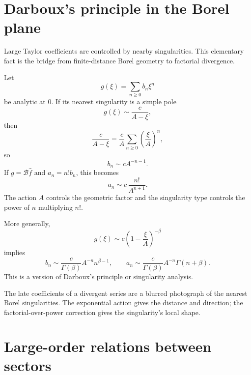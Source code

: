 \documentclass[11pt,openany]{book}
\theoremstyle{definition}
\theoremstyle{plain}
\theoremstyle{remark}
\newcommand{\trans}[1]{\widehat{#1}}
\newcommand{\Borel}{\mathcal{B}}
\begin{document}
\section{Darboux's principle in the Borel plane}

Large Taylor coefficients are controlled by nearby singularities. This elementary fact is the bridge from finite-distance Borel geometry to factorial divergence.

Let
\[
 g(\xi)=\sum_{n\ge0}b_n\xi^n
\]
be analytic at $0$. If its nearest singularity is a simple pole
\begin{equation}\label{eq:local-simple-pole}
 g(\xi)\sim\frac{c}{A-\xi},
\end{equation}
then
\[
 \frac{c}{A-\xi}
 =\frac{c}{A}\sum_{n\ge0}\left(\frac\xi A\right)^n,
\]
so
\begin{equation}\label{eq:darboux-pole}
 b_n\sim cA^{-n-1}.
\end{equation}
If $g=\Borel\trans f$ and $a_n=n!b_n$, this becomes
\begin{equation}\label{eq:factorial-from-pole}
 a_n\sim c\,\frac{n!}{A^{n+1}}.
\end{equation}
The action $A$ controls the geometric factor and the singularity type controls the power of $n$ multiplying $n!$.

More generally,
\begin{equation}\label{eq:branch-darboux}
 g(\xi)\sim c\left(1-\frac\xi A\right)^{-\beta}
\end{equation}
implies
\begin{equation}\label{eq:branch-coefficients}
 b_n\sim
 \frac{c}{\Gamma(\beta)}A^{-n}n^{\beta-1},
 \qquad
 a_n\sim
 \frac{c}{\Gamma(\beta)}A^{-n}\Gamma(n+\beta).
\end{equation}
This is a version of Darboux's principle or singularity analysis.

\begin{intuitionbox}
The late coefficients of a divergent series are a blurred photograph of the nearest Borel singularities. The exponential action gives the distance and direction; the factorial-over-power correction gives the singularity's local shape.
\end{intuitionbox}

\section{Large-order relations between sectors}
\end{document}

